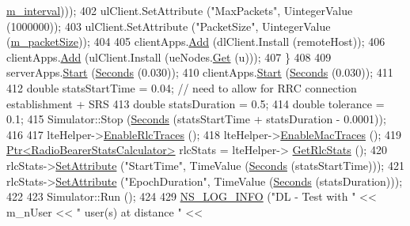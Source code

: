 \begin{DoxyCode}
      \hyperlink{classLenaPssFfMacSchedulerTestCase1_a4b23c7d1862c043863ee73ac3480a011}{m\_interval})));
402       ulClient.SetAttribute (\textcolor{stringliteral}{"MaxPackets"}, UintegerValue (1000000));
403       ulClient.SetAttribute (\textcolor{stringliteral}{"PacketSize"}, UintegerValue (\hyperlink{classLenaPssFfMacSchedulerTestCase1_a5e893d3cb1d5019807dba8960169ca6d}{m\_packetSize}));
404 
405       clientApps.\hyperlink{classns3_1_1ApplicationContainer_ad09ab1a1ad5849d518d5f4c262e38152}{Add} (dlClient.Install (remoteHost));
406       clientApps.\hyperlink{classns3_1_1ApplicationContainer_ad09ab1a1ad5849d518d5f4c262e38152}{Add} (ulClient.Install (ueNodes.\hyperlink{classns3_1_1NodeContainer_a9ed96e2ecc22e0f5a3d4842eb9bf90bf}{Get} (u)));
407     \}
408 
409   serverApps.\hyperlink{classns3_1_1ApplicationContainer_a8eff87926507020bbe3e1390358a54a7}{Start} (\hyperlink{group__timecivil_ga33c34b816f8ff6628e33d5c8e9713b9e}{Seconds} (0.030));
410   clientApps.\hyperlink{classns3_1_1ApplicationContainer_a8eff87926507020bbe3e1390358a54a7}{Start} (\hyperlink{group__timecivil_ga33c34b816f8ff6628e33d5c8e9713b9e}{Seconds} (0.030));
411 
412   \textcolor{keywordtype}{double} statsStartTime = 0.04; \textcolor{comment}{// need to allow for RRC connection establishment + SRS}
413   \textcolor{keywordtype}{double} statsDuration = 0.5;
414   \textcolor{keywordtype}{double} tolerance = 0.1;
415   Simulator::Stop (\hyperlink{group__timecivil_ga33c34b816f8ff6628e33d5c8e9713b9e}{Seconds} (statsStartTime + statsDuration - 0.0001));
416 
417   lteHelper->\hyperlink{classns3_1_1LteHelper_abadfdd04d30b261e9b6f0846b4784928}{EnableRlcTraces} ();
418   lteHelper->\hyperlink{classns3_1_1LteHelper_affa3a12841520407d3662417fe41863d}{EnableMacTraces} ();
419   \hyperlink{classns3_1_1Ptr}{Ptr<RadioBearerStatsCalculator>} rlcStats = lteHelper->
      \hyperlink{classns3_1_1LteHelper_a6eb438ccf69642e3863adea4991fa2ca}{GetRlcStats} ();
420   rlcStats->\hyperlink{classns3_1_1ObjectBase_ac60245d3ea4123bbc9b1d391f1f6592f}{SetAttribute} (\textcolor{stringliteral}{"StartTime"}, TimeValue (\hyperlink{group__timecivil_ga33c34b816f8ff6628e33d5c8e9713b9e}{Seconds} (statsStartTime)));
421   rlcStats->\hyperlink{classns3_1_1ObjectBase_ac60245d3ea4123bbc9b1d391f1f6592f}{SetAttribute} (\textcolor{stringliteral}{"EpochDuration"}, TimeValue (\hyperlink{group__timecivil_ga33c34b816f8ff6628e33d5c8e9713b9e}{Seconds} (statsDuration)));
422 
423   Simulator::Run ();
424 
429   \hyperlink{group__logging_gafbd73ee2cf9f26b319f49086d8e860fb}{NS\_LOG\_INFO} (\textcolor{stringliteral}{"DL - Test with "} << m\_nUser << \textcolor{stringliteral}{" user(s) at distance "} << 

\end{DoxyCode}
